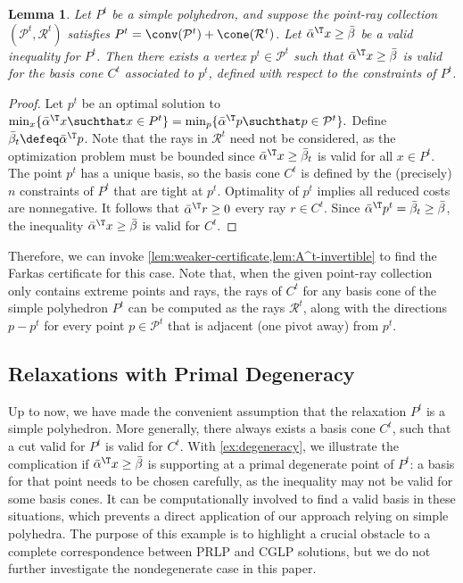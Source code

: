 \documentclass[oribibl,envcountsame]{llncs}
\newtheorem{lemma}[theorem]{Lemma}
\theoremstyle{remark}
\theoremstyle{definition}
\newcommand{\pointset}{\mathcal{P}}
\newcommand{\rayset}{\mathcal{R}}
\begin{document}
\begin{lemma}
\label{lem:nondegenerate-case}
    Let $P^t$ be a simple polyhedron,
    and suppose the point-ray collection $(\pointset^t,\rayset^t)$ satisfies $P^t = \conv(\pointset^t) + \cone(\rayset^t)$.
    Let $\bar{\alpha}^\T x \ge \bar{\beta}$ be a valid inequality for $P^t$.
    Then there exists a vertex $p^t \in \pointset^t$ such that $\bar{\alpha}^\T x \ge \bar{\beta}$ is valid for the basis cone $C^t$ associated to $p^t$, defined with respect to the constraints of $P^t$.
\end{lemma}
\begin{proof}
    Let $p^t$ be an optimal solution to 
        $
            \min_x \{ \bar{\alpha}^\T x \suchthat x \in P^t \} 
            = \min_p \{ \bar{\alpha}^\T p \suchthat p \in \pointset^t \}.
        $
    Define $\bar{\beta}_t \defeq \bar{\alpha}^\T p$.
    Note that the rays in $\rayset^t$ need not be considered, as the optimization problem must be bounded since $\bar{\alpha}^\T x \ge \bar{\beta}_t$ is valid for all $x \in P^t$.
    The point $p^t$ has a unique basis, so the basis cone $C^t$ is defined by the (precisely) $n$ constraints of $P^t$ that are tight at $p^t$.
    Optimality of $p^t$ implies all reduced costs are nonnegative.
    It follows that $\bar{\alpha}^\T r \ge 0$ every ray $r \in C^t$.
    Since $\bar{\alpha}^\T p^t = \bar{\beta}_t \ge \bar{\beta}$, 
    the inequality $\bar{\alpha}^\T x \ge \bar{\beta}$ is valid for $C^t$.
\end{proof}

Therefore, we can invoke \cref{lem:weaker-certificate,lem:A^t-invertible} to find the Farkas certificate for this case.
Note that, when the given point-ray collection only contains extreme points and rays, 
the rays of $C^t$ for any basis cone of the simple polyhedron $P^t$ can be computed as the rays $\rayset^t$,
along with the directions $p - p^t$ for every point $p \in \pointset^t$ that is adjacent (one pivot away) from $p^t$.

\subsection{Relaxations with Primal Degeneracy}
\label{sec:general-vpcs}

Up to now, we have made the convenient assumption that the relaxation $P^t$ is a simple polyhedron.
More generally, there always exists a basis cone $C^t$, such that a cut valid for $P^t$ is valid for $C^t$.
With \cref{ex:degeneracy}, we illustrate the complication if $\bar{\alpha}^\T x \ge \bar{\beta}$ is supporting at a primal degenerate point of $P^t$:
a basis for that point needs to be chosen carefully, as the inequality may not be valid for some basis cones.
It can be computationally involved to find a valid basis in these situations, which prevents a direct application of our approach relying on simple polyhedra.
The purpose of this example is to highlight a crucial obstacle to a complete correspondence between PRLP and CGLP solutions, but we do not further investigate the nondegenerate case in this paper.
\end{document}
